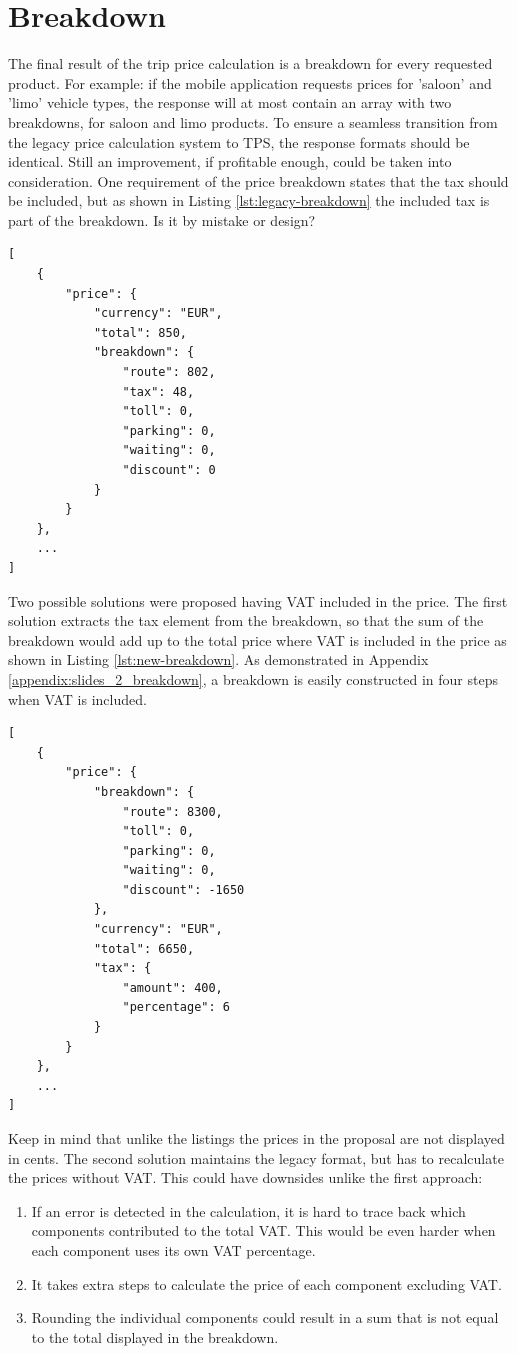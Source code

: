 \section{Breakdown}
The final result of the trip price calculation is a breakdown for every requested product. For example: if the mobile application requests prices for 'saloon' and 'limo' vehicle types, the response will at most contain an array with two breakdowns, for saloon and limo products. To ensure a seamless transition from the legacy price calculation system to TPS, the response formats should be identical. Still an improvement, if profitable enough, could be taken into consideration. One requirement of the price breakdown states that the tax should be included, but as shown in Listing \ref{lst:legacy-breakdown} the included tax is part of the breakdown. Is it by mistake or design?

\begin{lstlisting}[caption={Legacy price breakdown}, label={lst:legacy-breakdown}]
[
	{
		"price": {
			"currency": "EUR",
			"total": 850,
			"breakdown": {
				"route": 802,
				"tax": 48,
				"toll": 0,
				"parking": 0,
				"waiting": 0,
				"discount": 0
			}
		}
	},
	...
]
\end{lstlisting}

Two possible solutions were proposed having VAT included in the price. The first solution extracts the tax element from the breakdown, so that the sum of the breakdown would add up to the total price where VAT is included in the price as shown in Listing \ref{lst:new-breakdown}. As demonstrated in Appendix \ref{appendix:slides_2_breakdown}, a breakdown is easily constructed in four steps when VAT is included.

\begin{lstlisting}[caption={Improved price breakdown}, label={lst:new-breakdown}]
[
	{
		"price": {
			"breakdown": {
				"route": 8300,
				"toll": 0,
				"parking": 0,
				"waiting": 0,
				"discount": -1650
			},
			"currency": "EUR",
			"total": 6650,
			"tax": {
				"amount": 400,
				"percentage": 6
			}
		}
	},
	...
]
\end{lstlisting}

Keep in mind that unlike the listings the prices in the proposal are not displayed in cents. The second solution maintains the legacy format, but has to recalculate the prices without VAT. This could have downsides unlike the first approach:

\begin{enumerate}
	\item If an error is detected in the calculation, it is hard to trace back which components contributed to the total VAT. This would be even harder when each component uses its own VAT percentage.
	\item It takes extra steps to calculate the price of each component excluding VAT.
	\item Rounding the individual components could result in a sum that is not equal to the total displayed in the breakdown.
\end{enumerate}

